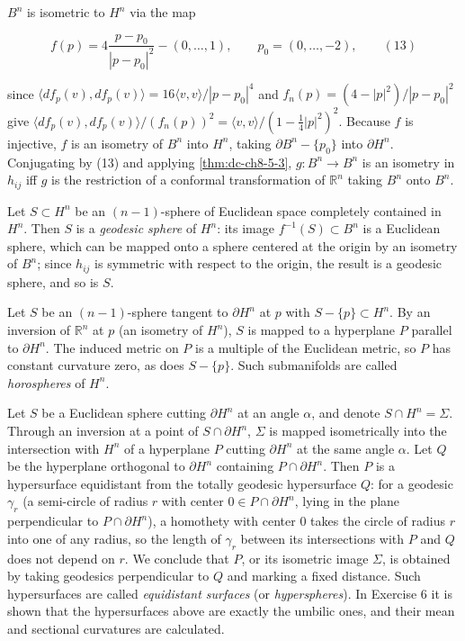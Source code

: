 \begin{remark}
  \label{rem:dc-ch8-5-4}
  $B^n$ is isometric to $H^n$ via the map
  
  $$
  f(p)=4\frac{p-p_0}{|p-p_0|^2}-(0,\dots,1),\qquad p_0=(0,\dots,-2),\qquad(13)
  $$
  
  since $\langle df_p(v),df_p(v)\rangle=16\langle v,v\rangle/|p-p_0|^4$ and
  $f_n(p)=(4-|p|^2)/|p-p_0|^2$ give
  $\langle df_p(v),df_p(v)\rangle/(f_n(p))^2=\langle v,v\rangle/(1-\tfrac14|p|^2)^2$.
  Because $f$ is injective, $f$ is an isometry of $B^n$ into $H^n$, taking
  $\partial B^n-\{p_0\}$ into $\partial H^n$. Conjugating by (13) and applying
  \cref{thm:dc-ch8-5-3}, $g:B^n\to B^n$ is an isometry in $h_{ij}$ iff $g$ is the
  restriction of a conformal transformation of $\mathbb{R}^n$ taking $B^n$ onto
  $B^n$.
  
  Let $S\subset H^n$ be an $(n-1)$-sphere of Euclidean space completely contained in
  $H^n$. Then $S$ is a \emph{geodesic sphere} of $H^n$: its image $f^{-1}(S)\subset B^n$ is
  a Euclidean sphere, which can be mapped onto a sphere centered at the origin by an
  isometry of $B^n$; since $h_{ij}$ is symmetric with respect to the origin, the
  result is a geodesic sphere, and so is $S$.
  
  Let $S$ be an $(n-1)$-sphere tangent to $\partial H^n$ at $p$ with
  $S-\{p\}\subset H^n$. By an inversion of $\mathbb{R}^n$ at $p$ (an isometry of
  $H^n$), $S$ is mapped to a hyperplane $P$ parallel to $\partial H^n$. The induced
  metric on $P$ is a multiple of the Euclidean metric, so $P$ has constant curvature
  zero, as does $S-\{p\}$. Such submanifolds are called \emph{horospheres} of $H^n$.
  
  Let $S$ be a Euclidean sphere cutting $\partial H^n$ at an angle $\alpha$, and
  denote $S\cap H^n=\Sigma$. Through an inversion at a point of $S\cap\partial H^n$,
  $\Sigma$ is mapped isometrically into the intersection with $H^n$ of a hyperplane $P$
  cutting $\partial H^n$ at the same angle $\alpha$. Let $Q$ be the hyperplane
  orthogonal to $\partial H^n$ containing $P\cap\partial H^n$. Then $P$ is a
  hypersurface equidistant from the totally geodesic hypersurface $Q$: for a geodesic
  $\gamma_r$ (a semi-circle of radius $r$ with center $0\in P\cap\partial H^n$,
  lying in the plane perpendicular to $P\cap\partial H^n$), a
  homothety with center $0$ takes the circle of radius $r$ into one of any radius, so
  the length of $\gamma_r$ between its intersections with $P$ and $Q$ does not depend
  on $r$. We conclude that $P$, or its isometric image $\Sigma$, is obtained by taking
  geodesics perpendicular to $Q$ and marking a fixed distance. Such hypersurfaces are
  called \emph{equidistant surfaces} (or \emph{hyperspheres}). In Exercise 6 it is shown that
  the hypersurfaces above are exactly the umbilic ones, and their mean and sectional
  curvatures are calculated.
\end{remark}
